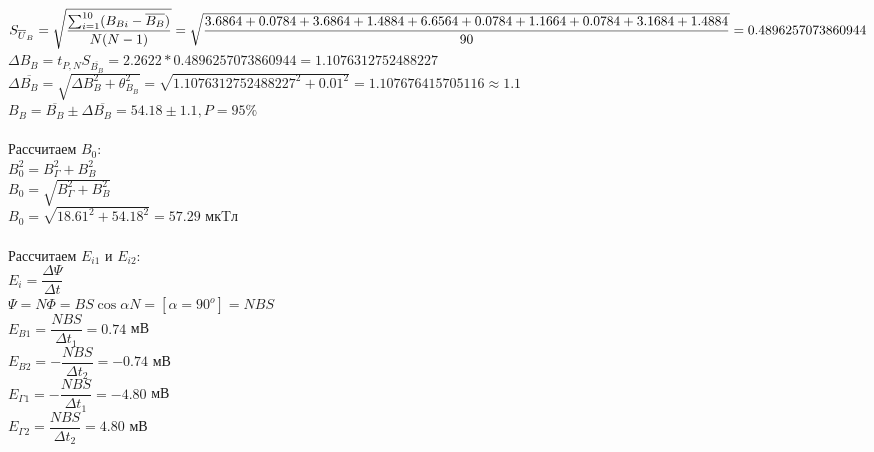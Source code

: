 $
S_{\overline U_B} = 
\sqrt{
    \dfrac
    {
        \sum_{i=1}^{10}(B_{Bi} - \overline{B_{B}})
    }
    {
        N(N-1)
    }
}
=\\
\sqrt{
    \dfrac
    {
        3.6864 + 0.0784 + 3.6864 + 1.4884 + 6.6564 + 0.0784 + 1.1664 + 0.0784 + 3.1684 + 1.4884
    }
    {
        90
    }
}
=\\
0.4896257073860944
$
\\

$ 
\varDelta B_{B} = 
t_{P,N}S_{\overline{B_{B}}} = 
2.2622 * 0.4896257073860944 = 
1.1076312752488227
$
\\

$ 
\varDelta \overline{B_{B}} = 
\sqrt{\varDelta B_{B}^2 + \theta_{B_{B}}^2} =
\sqrt{1.1076312752488227^2 + 0.01^2} = 
1.107676415705116 \approx 
1.1
$
\\

$ B_{B} = 
\overline{B_{B}} \pm \varDelta \overline{B_{B}} = 
54.18 \pm 1.1, P = 95\%
$
\\


\ \\

Рассчитаем $ B_0 $:\\

$ 
B_0^2 = 
B_\Gamma^2 + B_B^2 
$
\\

$ 
B_0 = 
\sqrt{B_\Gamma^2 + B_B^2}
$
\\

$ 
B_0 = 
\sqrt{18.61^2 + 54.18^2} = 
57.29 $ мкTл $
$
\\

\ \\

Рассчитаем $ E_{i1} $ и $ E_{i2} $:\\

$
E_i = \dfrac{\varDelta \Psi}{\varDelta t}
$
\\

$
\Psi = N\Phi = BS\cos{\alpha}N = [\alpha = 90^o ] = NBS
$
\\

$
E_{B1} = \dfrac{NBS}{\varDelta t_1} = 0.74
$ мВ
\\

$
E_{B2} = -\dfrac{NBS}{\varDelta t_2} = -0.74
$ мВ
\\

$
E_{\Gamma 1} = -\dfrac{NBS}{\varDelta t_1} = -4.80
$ мВ
\\

$
E_{\Gamma 2} = \dfrac{NBS}{\varDelta t_2} = 4.80
$ мВ
\\


